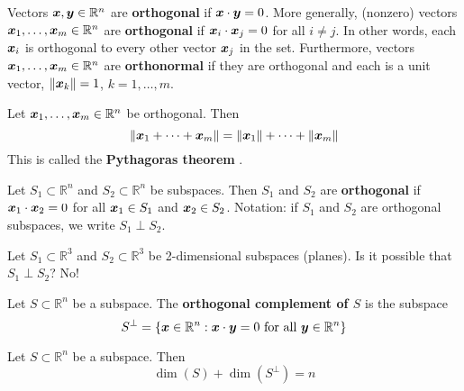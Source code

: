 \begin{definition}
Vectors $\boldsymbol{x}, \boldsymbol{y} \in \mathbb{R}^n$ are {\bf orthogonal} \cite[p.285]{KN} if $\boldsymbol{x} \cdot \boldsymbol{y} = 0$. More generally, (nonzero) vectors $\boldsymbol{x}_1, \dots, \boldsymbol{x}_m \in \mathbb{R}^n$ are {\bf orthogonal} if $\boldsymbol{x}_i \cdot \boldsymbol{x}_j = 0$ for all $i \not= j$. In other words, each $\boldsymbol{x}_i$ is orthogonal to every other vector $\boldsymbol{x}_j$ in the set. Furthermore, vectors $\boldsymbol{x}_1, \dots, \boldsymbol{x}_m \in \mathbb{R}^n$ are {\bf orthonormal} if they are orthogonal and each is a unit vector, $\| \boldsymbol{x}_k \| = 1$, $k=1,\dots,m$.
\end{definition}

\begin{theorem}
Let $\boldsymbol{x}_1, \dots, \boldsymbol{x}_m \in \mathbb{R}^n$ be orthogonal. Then
$$
\| \boldsymbol{x}_1 + \cdots + \boldsymbol{x}_m \| = \| \boldsymbol{x}_1 \| + \cdots + \| \boldsymbol{x}_m \|
$$
This is called the {\bf Pythagoras theorem} \cite[p.286]{KN}.
\end{theorem}

\begin{definition}
Let $S_1 \subset \mathbb{R}^n$ and $S_2 \subset \mathbb{R}^n$ be subspaces. Then $S_1$ and $S_2$ are {\bf orthogonal} if $\boldsymbol{x}_1 \cdot \boldsymbol{x}_2 = 0$ for all $\boldsymbol{x}_1 \in S_1$ and $\boldsymbol{x}_2 \in S_2$. Notation: if $S_1$ and $S_2$ are orthogonal subspaces, we write $S_1 \perp S_2$.
\end{definition}

\begin{example}
Let $S_1 \subset \mathbb{R}^3$ and $S_2 \subset \mathbb{R}^3$ be 2-dimensional subspaces (planes). Is it possible that $S_1 \perp S_2$? No!
\end{example}

\begin{definition}
Let $S \subset \mathbb{R}^n$ be a subspace. The {\bf orthogonal complement of $S$} \cite[p.418]{KN} is the subspace
$$
S^{\perp} = \{ \boldsymbol{x} \in \mathbb{R}^n : \boldsymbol{x} \cdot \boldsymbol{y} = 0 \text{ for all } \boldsymbol{y} \in \mathbb{R}^n \}
$$
\end{definition}

\begin{theorem}
Let $S \subset \mathbb{R}^n$ be a subspace. Then
$$
\dim(S) + \dim(S^{\perp}) = n
$$
\end{theorem}
